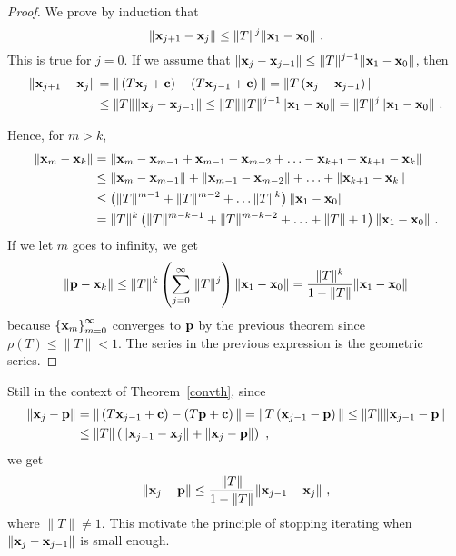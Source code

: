 \begin{proof}
We prove by induction that
\[
\|\mathbf{x}_{j+1} -\mathbf{x}_{j}\| \leq
\|T\|^j \|\mathbf{x}_{1} - \mathbf{x}_{0}\| \ .
\]
This is true for $j=0$.  If we assume that
$\displaystyle \|\mathbf{x}_{j} -\mathbf{x}_{j-1}\| \leq
\|T\|^{j-1} \|\mathbf{x}_{1} - \mathbf{x}_{0}\|$, then
\[
\begin{split}
\|\mathbf{x}_{j+1} -\mathbf{x}_{j}\|
&= \| \left(T\mathbf{x}_{j} + \mathbf{c} \right)
-\left(T\mathbf{x}_{j-1}+\mathbf{c}\right) \|
= \| T \left(\mathbf{x}_{j} - \mathbf{x}_{j-1} \right) \| \\
& \leq \|T\| \|\mathbf{x}_{j} - \mathbf{x}_{j-1}\|
\leq \|T\| \|T\|^{j-1} \|\mathbf{x}_{1} - \mathbf{x}_{0}\|
= \|T\|^{j} \|\mathbf{x}_{1} - \mathbf{x}_{0}\| \ .
\end{split}
\]

Hence, for $m > k$,
\[
\begin{split}
\|\mathbf{x}_{m} - \mathbf{x}_{k}\|
&= \|\mathbf{x}_{m} - \mathbf{x}_{m-1} + \mathbf{x}_{m-1} - \mathbf{x}_{m-2}
+ \ldots - \mathbf{x}_{k+1} + \mathbf{x}_{k+1} - \mathbf{x}_{k} \| \\
&\leq \|\mathbf{x}_{m} - \mathbf{x}_{m-1}\| + \|\mathbf{x}_{m-1} - \mathbf{x}_{m-2}\|
+ \ldots + \|\mathbf{x}_{k+1} - \mathbf{x}_{k}\| \\
&\leq \left(\|T\|^{m-1} + \|T\|^{m-2} + \ldots \|T\|^k\right)\|\mathbf{x}_{1} -
\mathbf{x}_{0}\|\\
&= \|T\|^k\left(\|T\|^{m-k-1} + \|T\|^{m-k-2} + \ldots + \|T\| +1\right)
\|\mathbf{x}_{1} - \mathbf{x}_{0}\| \ .
\end{split}
\]
If we let $m$ goes to infinity, we get
\[
\|\mathbf{p} - \mathbf{x}_{k}\| \leq \|T\|^k\left(
\sum_{j=0}^\infty \, \|T\|^j\right)\|\mathbf{x}_{1} - \mathbf{x}_{0}\| = 
\frac{\|T\|^k}{1-\|T\|} \|\mathbf{x}_{1} - \mathbf{x}_{0}\|
\]
because $\left\{\mathbf{x}_{m}\right\}_{m=0}^\infty$ converges to
$\mathbf{p}$ by the previous theorem since $\rho(T) \leq \|T\| <1$.  The
series in the previous expression is the geometric series.
\end{proof}

\begin{rmk}
Still in the context of Theorem~\ref{convth}, since
\[
\begin{split}
\|\mathbf{x}_{j} - \mathbf{p} \|
&= \| \left(T\mathbf{x}_{j-1} + \mathbf{c} \right) - \left(T\mathbf{p}+\mathbf{c}\right) \|
= \| T \left(\mathbf{x}_{j-1} - \mathbf{p}\right) \|
\leq \|T\| \|\mathbf{x}_{j-1} - \mathbf{p} \| \\
&\leq \|T\| \left( \|\mathbf{x}_{j-1} - \mathbf{x}_{j}\|
+ \|\mathbf{x}_{j} - \mathbf{p} \| \right) \ ,
\end{split}
\]
we get
\[
\| \mathbf{x}_{j} - \mathbf{p} \| \leq
\frac{\|T\|}{1-\|T\|} \|\mathbf{x}_{j-1}-\mathbf{x}_j\| \ ,
\]
where $\|T\|\neq 1$.  This motivate the principle of stopping
iterating when $\|\mathbf{x}_{j} - \mathbf{x}_{j-1}\|$ is small enough.
\end{rmk}

